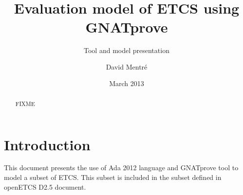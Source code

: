 \documentclass{template/openetcs_report}
\begin{document}
\frontmatter
{}




\title{Evaluation model of ETCS using GNATprove}

\subtitle{Tool and model presentation}

\date{March 2013}

\author{David Mentré}





\begin{abstract}
  FIXME
\end{abstract}

\maketitle
\tableofcontents
\listoffiguresandtables


\mainmatter

\chapter{Introduction}

This document presents the use of Ada 2012 language and GNATprove tool
to model a subset of ETCS. This subset is included in the subset
defined in openETCS D2.5 document\cite{openetcs:D2.5}.
\end{document}
